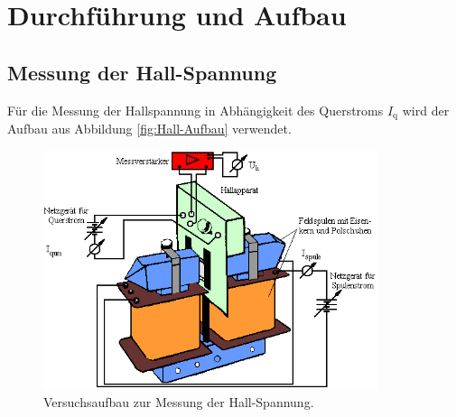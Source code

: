 \section{Durchführung und Aufbau}
\label{sec:Durchführung}

\subsection{Messung der Hall-Spannung}
Für die Messung der Hallspannung in Abhängigkeit des Querstroms $I_\text{q}$ wird der Aufbau aus Abbildung \eqref{fig:Hall-Aufbau} verwendet.

\begin{figure}[H]
  \centering
  \includegraphics[height=7cm]{picture/Hall-Aufbau.PNG}
  \caption{Versuchsaufbau zur Messung der Hall-Spannung. \cite{Leifi}}
  \label{fig:Hall-Aufbau}
\end{figure}
